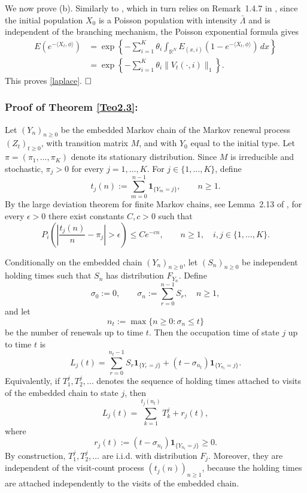 \documentclass[reqno,final,11pt]{amsart}
\newcommand{\1}{\mathbbm{1}}
\renewcommand{\cite}{\citet}
\theoremstyle{plain}
\theoremstyle{definition}
\theoremstyle{remark}
\begin{document}
We now prove \textup{(b)}. Similarly to \cite[page~622]{VW}, which in turn
relies on Remark~1.4.7 in \cite{LMW1988}, since the initial population
\(X_0\) is a Poisson population with intensity \(\bar\Lambda\) and is
independent of the branching mechanism, the Poisson exponential formula gives
\[
\begin{split}
E\left(e^{-\langle X_t,\phi\rangle}\right)
&=
\exp\left\{
-\sum_{i=1}^K\theta_i
\int_{\mathbb R^N}
E_{(x,i)}
\left(
1-e^{-\langle X_t,\phi\rangle}
\right)\,dx
\right\}
\\
&=
\exp\left\{
-\sum_{i=1}^K\theta_i\|V_t(\cdot,i)\|_1
\right\}.
\end{split}
\]
This proves \eqref{laplace}.
\(\hfill\square\)
\subsubsection*{Proof of Theorem \ref{Teo2.3}:}
Let \((Y_n)_{n\ge0}\) be the embedded Markov chain of the Markov renewal process
\((Z_t)_{t\ge0}\), with transition matrix \(M\), and with \(Y_0\) equal to the
initial type. Let \(\pi=(\pi_1,\dots,\pi_K)\) denote its stationary
distribution. Since \(M\) is irreducible and stochastic, \(\pi_j>0\) for every
\(j=1,\dots,K\). For \(j\in\{1,\dots,K\}\), define
\[
t_j(n):=\sum_{m=0}^{n-1}\mathbf 1_{\{Y_m=j\}},
\qquad n\ge1.
\]
By the large deviation theorem for finite Markov chains, see Lemma~2.13 of
\cite{Golds}, for every \(\epsilon>0\) there exist constants \(C,c>0\) such that
\begin{equation}\label{ldmc}
P_i\left(
\left|
\frac{t_j(n)}{n}-\pi_j
\right|>\epsilon
\right)
\le
Ce^{-cn},
\qquad n\ge1,\quad i,j\in\{1,\dots,K\}.
\end{equation}

Conditionally on the embedded chain \((Y_n)_{n\ge0}\), let
\((S_n)_{n\ge0}\) be independent holding times such that \(S_n\) has
distribution \(F_{Y_n}\). Define
\[
\sigma_0:=0,\qquad
\sigma_n:=\sum_{r=0}^{n-1}S_r,\quad n\ge1,
\]
and let
\[
n_t:=\max\{n\ge0:\sigma_n\le t\}
\]
be the number of renewals up to time \(t\). Then the occupation time of state
\(j\) up to time \(t\) is
\[
L_j(t)
=
\sum_{r=0}^{n_t-1}S_r\mathbf 1_{\{Y_r=j\}}
+
(t-\sigma_{n_t})\mathbf 1_{\{Y_{n_t}=j\}}.
\]
Equivalently, if \(T_1^j,T_2^j,\ldots\) denotes the sequence of holding times
attached to visits of the embedded chain to state \(j\), then
\[
L_j(t)
=
\sum_{k=1}^{t_j(n_t)}T_k^j
+
r_j(t),
\]
where
\[
r_j(t):=(t-\sigma_{n_t})\mathbf 1_{\{Y_{n_t}=j\}}\ge0.
\]
By construction, \(T_1^j,T_2^j,\ldots\) are i.i.d. with distribution \(F_j\).
Moreover, they are independent of the visit-count process
\((t_j(n))_{n\ge1}\), because the holding times are attached independently to
the visits of the embedded chain.
\end{document}
